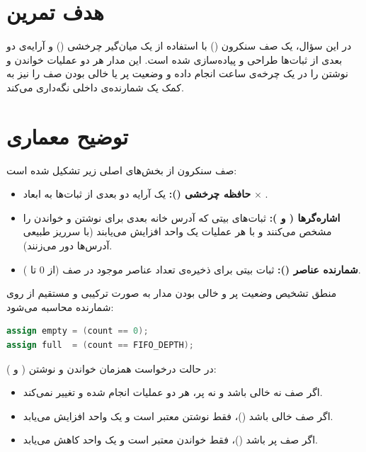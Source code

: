 \section{هدف تمرین}
در این سؤال، یک صف سنکرون () با استفاده از یک میان‌گیر چرخشی () و آرایه‌ی دو بعدی از ثبات‌ها طراحی و پیاده‌سازی شده است. این مدار هر دو عملیات خواندن و نوشتن را در یک چرخه‌ی ساعت انجام داده و وضعیت پر یا خالی بودن صف را نیز به کمک یک شمارنده‌ی داخلی نگه‌داری می‌کند.


\section{توضیح معماری}

صف سنکرون از بخش‌های اصلی زیر تشکیل شده است:

\begin{itemize}
    \item \textbf{حافظه چرخشی ():} یک آرایه دو بعدی از ثبات‌ها به ابعاد  $\times$ .
    \item \textbf{اشاره‌گرها ( و ):} ثبات‌های  بیتی که آدرس خانه بعدی برای نوشتن و خواندن را مشخص می‌کنند و با هر عملیات یک واحد افزایش می‌یابند (با سرریز طبیعی آدرس‌ها دور می‌زنند).
    \item \textbf{شمارنده عناصر ():} ثبات  بیتی برای ذخیره‌ی تعداد عناصر موجود در صف (از $0$ تا ).
\end{itemize}

منطق تشخیص وضعیت پر و خالی بودن مدار به صورت ترکیبی و مستقیم از روی شمارنده محاسبه می‌شود:
\begin{latin}
    \begin{lstlisting}[language=Verilog]
assign empty = (count == 0);
assign full  = (count == FIFO_DEPTH);
\end{lstlisting}
\end{latin}

در حالت درخواست همزمان خواندن و نوشتن ( و ):
\begin{itemize}
    \item اگر صف نه خالی باشد و نه پر، هر دو عملیات انجام شده و  تغییر نمی‌کند.
    \item اگر صف خالی باشد ()، فقط نوشتن معتبر است و  یک واحد افزایش می‌یابد.
    \item اگر صف پر باشد ()، فقط خواندن معتبر است و  یک واحد کاهش می‌یابد.
\end{itemize}


